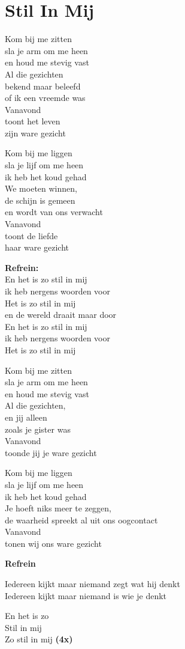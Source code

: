 \section{Stil In Mij}
Kom bij me zitten\\
sla je arm om me heen\\
en houd me stevig vast\\
Al die gezichten\\
bekend maar beleefd\\
of ik een vreemde was\\
Vanavond\\
toont het leven\\
zijn ware gezicht

Kom bij me liggen\\
sla je lijf om me heen\\
ik heb het koud gehad\\
We moeten winnen,\\
de schijn is gemeen\\
en wordt van ons verwacht\\
Vanavond\\
toont de liefde\\
haar ware gezicht

\textbf{Refrein:}\\
En het is zo stil in mij\\
ik heb nergens woorden voor\\
Het is zo stil in mij\\
en de wereld draait maar door\\
En het is zo stil in mij\\
ik heb nergens woorden voor\\
Het is zo stil in mij

Kom bij me zitten\\
sla je arm om me heen\\
en houd me stevig vast\\
Al die gezichten,\\
en jij alleen\\
zoals je gister was\\
Vanavond\\
toonde jij je ware gezicht

Kom bij me liggen\\
sla je lijf om me heen\\
ik heb het koud gehad\\
Je hoeft niks meer te zeggen,\\
de waarheid spreekt al uit ons oogcontact\\
Vanavond\\
tonen wij ons ware gezicht

\textbf{Refrein}

Iedereen kijkt maar niemand zegt wat hij denkt\\
Iedereen kijkt maar niemand is wie je denkt

En het is zo\\
Stil in mij\\
Zo stil in mij \textbf{(4x)}
